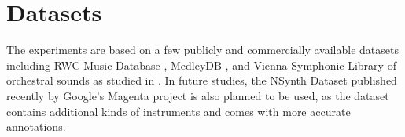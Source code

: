 
\section{Datasets}

The experiments are based on a few publicly and commercially available datasets including RWC Music Database \cite{goto2003rwc}, MedleyDB \cite{bittner2014medleydb}, and Vienna Symphonic Library of orchestral sounds as studied in \cite{humphrey2011nlse}.
In future studies, the NSynth Dataset published recently by Google's Magenta project \cite{engel2017nsynth} is also planned to be used, as the dataset contains additional kinds of instruments and comes with more accurate annotations.

